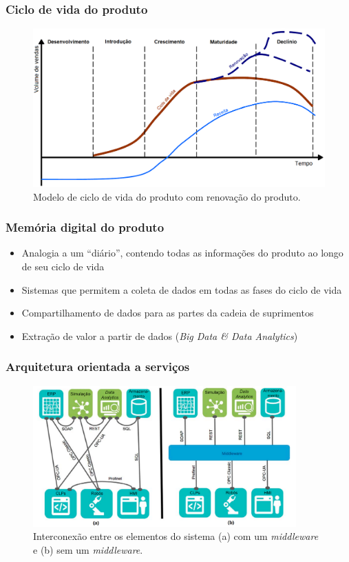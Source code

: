 \documentclass[10pt]{beamer}
\begin{document}
\begin{frame}
	\frametitle{Ciclo de vida do produto} 
	
	\begin{figure}[htb]
		\centering
		\caption{Modelo de ciclo de vida do produto com renovação do produto.}
		\label{fig:ciclo-de-vida-extensao}
		\includegraphics[width=1\textwidth]{ciclo-de-vida-extensao.png}
	\end{figure}
	
\end{frame}
\begin{frame}
	\frametitle{Memória digital do produto} 
	
	\begin{itemize}
		\item Analogia a um ``diário'', contendo todas as informações do produto ao longo de seu ciclo de vida
		\item Sistemas que permitem a coleta de dados em todas as fases do ciclo de vida
		\item Compartilhamento de dados para as partes da cadeia de suprimentos
		\item Extração de valor a partir de dados (\textit{Big Data \& Data Analytics})
	\end{itemize}
	
\end{frame}
\begin{frame}
	\frametitle{Arquitetura orientada a serviços} 
	
	\begin{figure}[htb]
		\centering
		\caption{Interconexão entre os elementos do sistema (a) com um \textit{middleware} e (b) sem um \textit{middleware}.}
		\label{fig:middleware}
		\includegraphics[width=0.9\textwidth]{middleware.png}
	\end{figure}
	
\end{frame}
\end{document}
